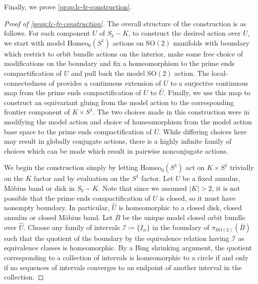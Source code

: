 \documentclass[10pt, oneside]{article}
\newcommand{\SO}[1][2]{\text{SO}(#1)}
\newcommand{\homeo}[1][S^1]{\text{Homeo}_0(#1)}
\newcommand{\cl}[1]{\overline{#1}}
\theoremstyle{definition}
\theoremstyle{definition}
\begin{document}
Finally, we prove \cref{prop:lc-fr-construction}. 

\begin{proof}[Proof of \cref{prop:lc-fr-construction}]
    The overall structure of the construction is as follows.
    For each component $U$ of $S_b - K$, to construct the desired action over $U$, we start with model $\homeo$ actions on $\SO$ manifolds with boundary which restrict to orbit bundle actions on the interior, make some free choice of modifications on the boundary and fix a homeomorphism to the prime ends compactification of $U$ and pull back the model $\SO$ action. The local-connectedness of provides a continuous extension of $U$ to a surjective continuous map from the prime ends compactification of $U$ to $\bar{U}$. Finally, we use this map to construct an equivariant gluing from the model action to the corresponding frontier component of $K\times S^1$. The two choices made in this construction were in modifying the model action and choice of homeomorphism from the model action base space to the prime ends compactification of $U$. While differing choices here may result in globally conjugate actions, there is a highly infinite family of choices which can be made which result in pairwise nonconjugate actions.
    
    We begin the construction simply by letting $\homeo$ act on $K\times S^1$ trivially on the $K$ factor and by evaluation on the $S^1$ factor. Let $U$ be a fixed annulus, M\"{o}bius band or disk in $S_b - K$. Note that since we assumed $\lvert K\rvert > 2$, it is not possible that the prime ends compactification of $U$ is closed, so it must have nonempty boundary. In particular, $\hat{U}$ is homeomorphic to a closed disk, closed annulus or closed M\"{o}bius band. Let $\cl{B}$ be the unique model closed orbit bundle over $\hat{U}$. Choose any family of intervals $\mathscr{I}\coloneqq \{I_\alpha\}$ in the boundary of $\pi_{\SO}(\cl{B})$ such that the quotient of the boundary by the equivalence relation having $\mathscr{I}$ as equivalence classes is homeomorphic. By a Bing shrinking argument, the quotient corresponding to a collection of intervals is homeomorphic to a circle if and only if no sequences of intervals converges to an endpoint of another interval in the collection. 
    

\end{proof}
\end{document}
